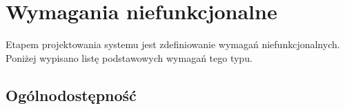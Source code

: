 \section{Wymagania niefunkcjonalne}

Etapem projektowania systemu jest zdefiniowanie wymagań niefunkcjonalnych. Poniżej wypisano listę podstawowych wymagań tego typu.
\subsection{Ogólnodostępność}

